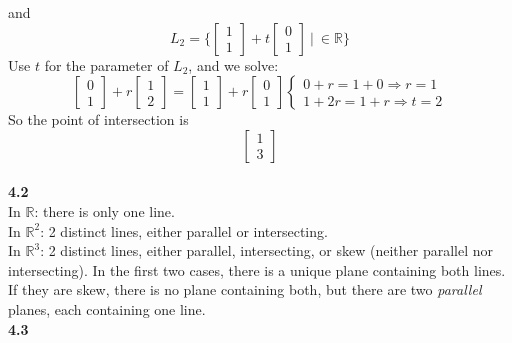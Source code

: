 \documentclass[]{article}
\begin{document}
		and
		$$
			 L_2=\{ \begin{bmatrix}{1}\\{1}\end{bmatrix}+t\begin{bmatrix}{0}\\{1}\end{bmatrix}~|~\in\mathbb{R} \}
		$$
		Use $t$ for the parameter of $L_2$, and we solve:\\
		$$
		\begin{bmatrix}
			{0}\\
			{1}
		\end{bmatrix}+r
		\begin{bmatrix}
			{1}\\
			{2}
		\end{bmatrix}=
		\begin{bmatrix}
			{1}\\
			{1}
		\end{bmatrix}+r
		\begin{bmatrix}
			{0}\\
			{1}
		\end{bmatrix}
		\begin{cases}
			0+r=1+0\Rightarrow r=1\\
			1+2r=1+r\Rightarrow t=2
		\end{cases}$$
		So the point of intersection is
		$$
		\begin{bmatrix}
			{1}\\
			{3}
		\end{bmatrix}$$\\
		{\bf 4.2}\\
		In $\mathbb{R}$: there is only one line.\\
		In $\mathbb{R}^2$: 2 distinct lines, either parallel or intersecting.\\
		In $\mathbb{R}^3$: 2 distinct lines, either parallel, intersecting, or skew (neither parallel nor intersecting). In the first two cases, there is a unique plane containing both lines.\\
		If they are skew, there is no plane containing both, but there are two \emph{parallel} planes, each containing one line.
		\pagebreak\\
		{\bf 4.3}\\
\end{document}
